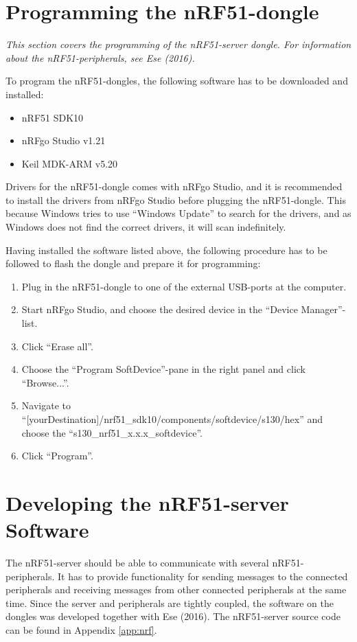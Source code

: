 \section{Programming the nRF51-dongle}
\label{sec:prognrf}
\textit{This section covers the programming of the nRF51-server dongle. For information about the nRF51-peripherals, see Ese (2016).}

\label{sec:nrfrequirements}
To program the nRF51-dongles, the following software has to be downloaded and installed:
\begin{itemize}
    \item nRF51 SDK10\cite{nrf51sdk}
    \item nRFgo Studio v1.21\cite{nrfgo}
    \item Keil MDK-ARM v5.20\cite{keil}
\end{itemize}
Drivers for the nRF51-dongle comes with nRFgo Studio, and it is recommended to install the drivers from nRFgo Studio before plugging the nRF51-dongle. This because Windows tries to use ``Windows Update'' to search for the drivers, and as Windows does not find the correct drivers, it will scan indefinitely.

Having installed the software listed above, the following procedure has to be followed to flash the dongle and prepare it for programming:
\begin{enumerate}
    \item Plug in the nRF51-dongle to one of the external USB-ports at the computer.
    \item Start nRFgo Studio, and choose the desired device in the ``Device Manager''-list.
    \item Click ``Erase all''.
    \item Choose the ``Program SoftDevice''-pane in the right panel and click ``Browse...''.
    \item Navigate to ``[yourDestination]/nrf51\_sdk10/components/softdevice/s130/hex'' and choose the ``s130\_nrf51\_x.x.x\_softdevice''.
    \item Click ``Program''.
\end{enumerate}

\section{Developing the nRF51-server Software}
\label{sec:devnrf}
The nRF51-server should be able to communicate with several nRF51-peripherals. It has to provide functionality for sending messages to the connected peripherals and receiving messages from other connected peripherals at the same time. Since the server and peripherals are tightly coupled, the software on the dongles was developed together with Ese (2016). The nRF51-server source code can be found in Appendix \ref{app:nrf}.

